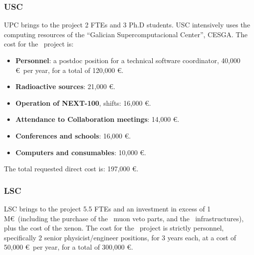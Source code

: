 \subsubsection{USC}
UPC brings to the project 2 FTEs and 3 Ph.D students. USC intensively uses the computing resources of the ``Galician Supercomputacional Center'', CESGA. The cost for the \sUSC\ project is:

\begin{itemize}[noitemsep,topsep=0pt,parsep=0pt,partopsep=0pt]
    \item {\bf Personnel}: a postdoc position for a technical software coordinator, 40,000 \euro\ per year, for a total of 120,000 \euro.
    \item {\bf Radioactive sources}: 21,000 \euro.
    \item {\bf Operation of NEXT-100}, shifts: 16,000 \euro.
    \item {\bf Attendance to Collaboration meetings}: 14,000 \euro.
    \item {\bf Conferences and schools}:  16,000 \euro.
    \item {\bf Computers and consumables}: 10,000 \euro.
\end{itemize}

The total requested direct cost is: 197,000 \euro.
\subsubsection{LSC}

LSC brings to the project 5.5 FTEs and an investment in excess of 1 M\euro\ (including the purchase of the \Next\ muon veto parts, and the \NHD\ infrastructures), plus the cost of the xenon. The cost for the \sLSC\ project is strictly personnel, specifically 2 senior physicist/engineer positions, for 3 years each, at a cost of 
50,000 \euro\ per year, for a total of 300,000 \euro.
 